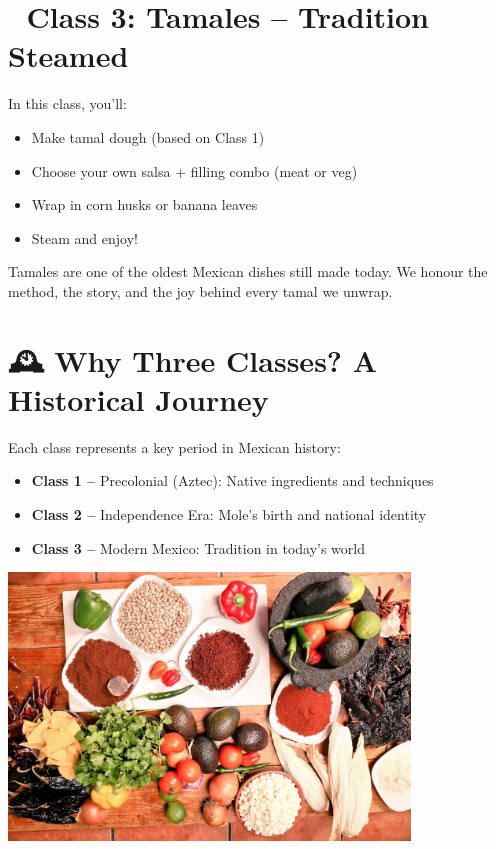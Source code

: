 \documentclass[12pt]{article}
\begin{document}
\section*{🌽 Class 3: Tamales – Tradition Steamed}

In this class, you’ll:
\begin{itemize}
\item Make tamal dough (based on Class 1)
\item Choose your own salsa + filling combo (meat or veg)
\item Wrap in corn husks or banana leaves
\item Steam and enjoy!
\end{itemize}

Tamales are one of the oldest Mexican dishes still made today. We honour the method, the story, and the joy behind every tamal we unwrap.

\vspace{1em}
\section*{🕰️ Why Three Classes? A Historical Journey}

Each class represents a key period in Mexican history:
\begin{itemize}
\item \textbf{Class 1 –} Precolonial (Aztec): Native ingredients and techniques
\item \textbf{Class 2 –} Independence Era: Mole’s birth and national identity
\item \textbf{Class 3 –} Modern Mexico: Tradition in today’s world
\end{itemize}

\vspace{1em}
\begin{center}
\includegraphics[width=0.8\textwidth]{assets/images/spices_clear.JPG}
\end{center}
\end{document}
